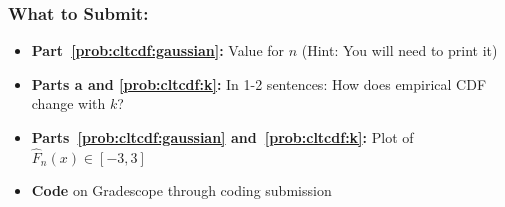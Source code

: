 \documentclass{article}
\begin{document}
\begin{aprob}
    \subsubsection*{What to Submit:}
    \begin{itemize}
        \item \textbf{Part~\ref{prob:cltcdf:gaussian}:} Value for $n$ (Hint: You will need to print it)
        \item \textbf{Parts a and \ref{prob:cltcdf:k}:} In 1-2 sentences: How does empirical CDF change with $k$?
        \item \textbf{Parts~\ref{prob:cltcdf:gaussian} and~\ref{prob:cltcdf:k}:} Plot of $\widehat{F}_n(x) \in [-3, 3]$
        \item \textbf{Code} on Gradescope through coding submission
    \end{itemize}
\end{aprob}
\end{document}
